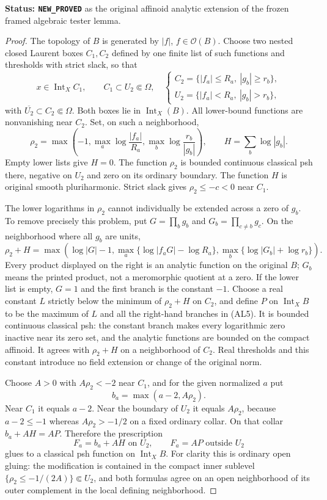 \documentclass[11pt,a4paper]{article}
\numberwithin{equation}{section}
\theoremstyle{definition}
\theoremstyle{remark}
\begin{document}
\noindent\textbf{Status: \texttt{NEW\_PROVED}} as the
original affinoid analytic extension of the frozen framed
algebraic tester lemma.

\begin{proof}
The topology of $B$ is generated by $|f|$, $f\in\mathcal O(B)$.
Choose two nested closed Laurent boxes $C_1,C_2$ defined by
one finite list of such functions and thresholds with strict
slack, so that
\[
 x\in\operatorname{Int}_X C_1,\qquad
 C_1\subset U_2\Subset\Omega,
 \quad
 \begin{cases}
 C_2=\{|f_a|\leq R_a,\ |g_b|\geq r_b\},\\
 U_2=\{|f_a|<R_a,\ |g_b|>r_b\},
 \end{cases}
 \tag{AL3}
\]
with $\overline{U_2}\subset C_2\Subset\Omega$.
Both boxes lie in $\operatorname{Int}_X(B)$.
All lower-bound functions are nonvanishing near $C_2$.
Set, on such a neighborhood,
\[
 \rho_2=\max\left(-1,\max_a\log\frac{|f_a|}{R_a},
                           \max_b\log\frac{r_b}{|g_b|}\right),
 \qquad H=\sum_b\log|g_b|.
 \tag{AL4}
\]
Empty lower lists give $H=0$. The function $\rho_2$ is
bounded continuous classical psh there, negative on $U_2$
and zero on its ordinary boundary. The function $H$ is
original smooth pluriharmonic. Strict slack gives
$\rho_2\leq-c<0$ near $C_1$.

The lower logarithms in $\rho_2$ cannot individually be
extended across a zero of $g_b$. To remove precisely this
problem, put $G=\prod_b g_b$ and $G_b=\prod_{c\ne b}g_c$.
On the neighborhood where all $g_b$ are units,
\[
 \rho_2+H
  =\max\left(\log|G|-1,
        \max_a\{\log|f_aG|-\log R_a\},
        \max_b\{\log|G_b|+\log r_b\}\right).
 \tag{AL5}
\]
Every product displayed on the right is an analytic function
on the original $B$; $G_b$ means the printed product, not a
meromorphic quotient at a zero. If the lower list is empty,
$G=1$ and the first branch is the constant $-1$.
Choose a real constant $L$ strictly below the minimum of
$\rho_2+H$ on $C_2$, and define $P$ on $\operatorname{Int}_X B$
to be the maximum of $L$ and all the right-hand branches in
(AL5). It is bounded continuous classical psh: the constant
branch makes every logarithmic zero inactive near its zero
set, and the analytic functions are bounded on the compact
affinoid. It agrees with $\rho_2+H$ on a neighborhood of
$C_2$. Real thresholds and this constant introduce no field
extension or change of the original norm.

Choose $A>0$ with $A\rho_2<-2$ near $C_1$, and for the
given normalized $a$ put
\[
                     b_a=\max(a-2,A\rho_2).
 \tag{AL6}
\]
Near $C_1$ it equals $a-2$. Near the boundary of $U_2$ it
equals $A\rho_2$, because $a-2\leq-1$ whereas
$A\rho_2>-1/2$ on a fixed ordinary collar. On that collar
$b_a+AH=AP$. Therefore the prescription
\[
 F_a=b_a+AH\text{ on }U_2,
       \qquad F_a=AP\text{ outside }U_2
 \tag{AL7}
\]
glues to a classical psh function on $\operatorname{Int}_X B$.
For clarity this is ordinary open gluing: the modification
is contained in the compact inner sublevel
$\{\rho_2\leq-1/(2A)\}\Subset U_2$, and both formulas
agree on an open neighborhood of its outer complement in
the local defining neighborhood.


\end{proof}
\end{document}
